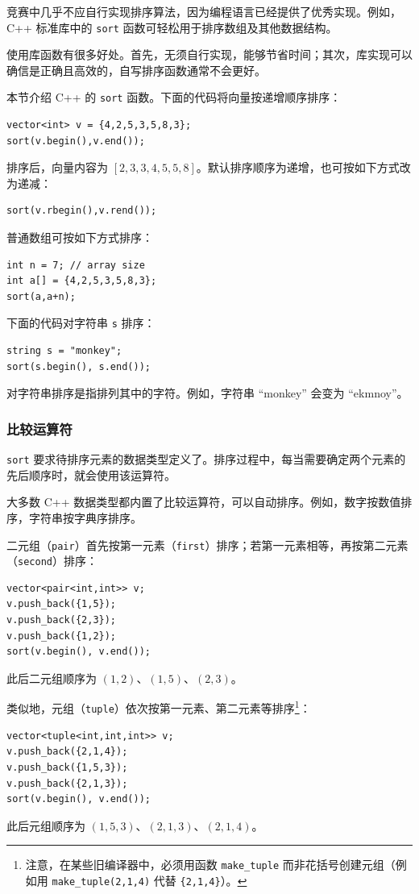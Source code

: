 
竞赛中几乎不应自行实现排序算法，因为编程语言已经提供了优秀实现。例如，C++ 标准库中的 \texttt{sort} 函数可轻松用于排序数组及其他数据结构。

使用库函数有很多好处。首先，无须自行实现，能够节省时间；其次，库实现可以确信是正确且高效的，自写排序函数通常不会更好。

本节介绍 C++ 的 \texttt{sort} 函数。下面的代码将向量按递增顺序排序：
\begin{lstlisting}
vector<int> v = {4,2,5,3,5,8,3};
sort(v.begin(),v.end());
\end{lstlisting}
排序后，向量内容为 $[2,3,3,4,5,5,8]$。默认排序顺序为递增，也可按如下方式改为递减：
\begin{lstlisting}
sort(v.rbegin(),v.rend());
\end{lstlisting}
普通数组可按如下方式排序：
\begin{lstlisting}
int n = 7; // array size
int a[] = {4,2,5,3,5,8,3};
sort(a,a+n);
\end{lstlisting}
\newpage
下面的代码对字符串 \texttt{s} 排序：
\begin{lstlisting}
string s = "monkey";
sort(s.begin(), s.end());
\end{lstlisting}
对字符串排序是指排列其中的字符。例如，字符串 ``monkey'' 会变为 ``ekmnoy''。

\subsubsection{比较运算符}


\texttt{sort} 要求待排序元素的数据类型定义了。排序过程中，每当需要确定两个元素的先后顺序时，就会使用该运算符。

大多数 C++ 数据类型都内置了比较运算符，可以自动排序。例如，数字按数值排序，字符串按字典序排序。


二元组（\texttt{pair}）首先按第一元素（\texttt{first}）排序；若第一元素相等，再按第二元素（\texttt{second}）排序：
\begin{lstlisting}
vector<pair<int,int>> v;
v.push_back({1,5});
v.push_back({2,3});
v.push_back({1,2});
sort(v.begin(), v.end());
\end{lstlisting}
此后二元组顺序为 $(1,2)$、$(1,5)$、$(2,3)$。


类似地，元组（\texttt{tuple}）依次按第一元素、第二元素等排序\footnote{注意，在某些旧编译器中，必须用函数 \texttt{make\_tuple} 而非花括号创建元组（例如用 \texttt{make\_tuple(2,1,4)} 代替 \texttt{\{2,1,4\}}）。}：
\begin{lstlisting}
vector<tuple<int,int,int>> v;
v.push_back({2,1,4});
v.push_back({1,5,3});
v.push_back({2,1,3});
sort(v.begin(), v.end());
\end{lstlisting}
此后元组顺序为 $(1,5,3)$、$(2,1,3)$、$(2,1,4)$。

